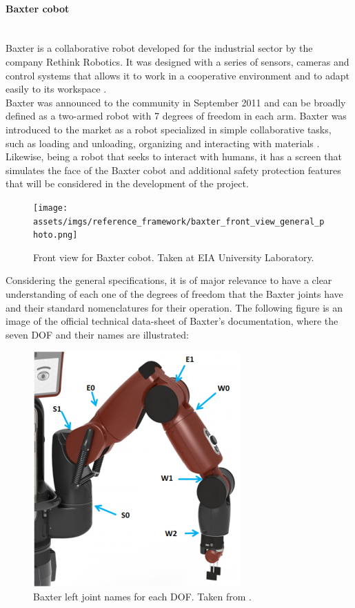 \documentclass[11pt]{report} %
\newcommand{\subsubsubsection}[1]{\paragraph{#1}\mbox{}\\}
\begin{document}
\subsubsubsection{Baxter cobot}

Baxter is a collaborative robot developed for the industrial sector by the company Rethink Robotics. It was designed with a series of sensors, cameras and control systems that allows it to work in a cooperative environment and to adapt easily to its workspace \citep{cite_rethink_robotics_official_page}.\\

Baxter was announced to the community in September 2011 and can be broadly defined as a two-armed robot with 7 degrees of freedom in each arm. Baxter was introduced to the market as a robot specialized in simple collaborative tasks, such as loading and unloading, organizing and interacting with materials \citep{cite_sdk_baxter_rethink_robotics}. Likewise, being a robot that seeks to interact with humans, it has a screen that simulates the face of the Baxter cobot and additional safety protection features that will be considered in the development of the project.

\begin{figure}[H]
    \centering
    \texttt{[image: assets/imgs/reference\_framework/baxter\_front\_view\_general\_photo.png]}
    \caption{Front view for Baxter cobot. Taken at EIA University Laboratory.} 
    \label{fig_baxter_main_image}
\end{figure}

Considering the general specifications, it is of major relevance to have a clear understanding of each one of the degrees of freedom that the Baxter joints have and their standard nomenclatures for their operation. The following figure is an image of the official technical data-sheet of Baxter's documentation, where the seven DOF and their names are illustrated:

\begin{figure}[H]
    \centering
    \includegraphics[width=0.4\linewidth]{assets/imgs/reference_framework/baxter_joint_names.png}
    \caption{Baxter left joint names for each DOF. Taken from \citep{cite_baxter_joint_names_from_sdk_wiki}.} 
    \label{fig_baxter_joint_names}
\end{figure}
\end{document}
